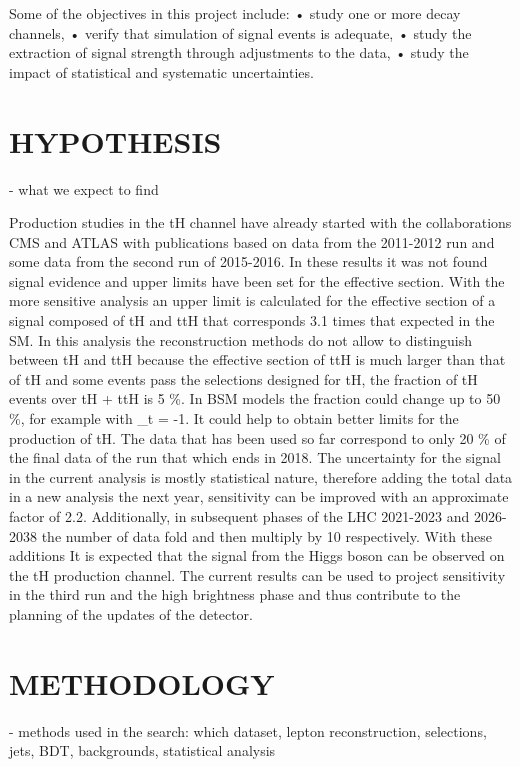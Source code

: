 \documentclass[final,3p]{CSP}
\begin{document}
Some of the objectives in this project include:
• study one or more decay channels,
• verify that simulation of signal events is adequate,
• study the extraction of signal strength through adjustments to the data,
• study the impact of statistical and systematic uncertainties.


\section{HYPOTHESIS}
- what we expect to find

Production studies in the tH channel have already started with the collaborations CMS and ATLAS with publications based on data from the 
2011-2012 run and some data from the second run of 2015-2016. In these results it was not found signal evidence and upper limits have 
been set for the effective section. With the more sensitive analysis an upper limit is calculated for the effective section of a signal 
composed of tH and ttH that corresponds 3.1 times that expected in the SM. In this analysis the reconstruction methods do not allow to 
distinguish between tH and ttH because the effective section of ttH is much larger than that of tH and some events pass the
selections designed for tH, the fraction of tH events over tH + ttH is 5 \%. In BSM models the fraction could change up to 50 \%, for 
example with \kappa_t = -1. It could help to obtain better limits for the production of tH. The data that has been used so far 
correspond to only 20 \% of the final data of the run that which ends in 2018. The uncertainty for the signal in the current analysis is 
mostly statistical nature, therefore adding the total data in a new analysis the next year, sensitivity can be improved with an 
approximate factor of 2.2. Additionally, in subsequent phases of the LHC 2021-2023 and 2026-2038 the number of data fold and then 
multiply by 10 respectively. With these additions It is expected that the signal from the Higgs boson can be observed on the tH 
production channel. The current results can be used to project sensitivity in the third run and the high brightness phase and thus 
contribute to the planning of the updates of the detector.

\section{METHODOLOGY}
- methods used in the search: which dataset,  lepton reconstruction, selections, jets, BDT, backgrounds, statistical analysis
\end{document}
